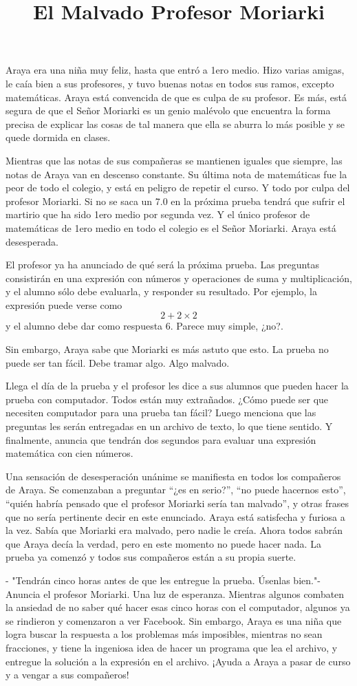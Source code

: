 \documentclass{oci}
\title{El Malvado Profesor Moriarki}
\begin{document}
\begin{problemDescription}
Araya era una niña muy feliz, hasta que entró a 1ero medio. Hizo varias amigas, le caía bien a sus profesores, y tuvo buenas notas en todos sus ramos, excepto matemáticas. Araya está convencida de que es culpa de su profesor. Es más, está segura de que el Señor Moriarki es un genio malévolo que encuentra la forma precisa de explicar las cosas de tal manera que ella se aburra lo más posible y se quede dormida en clases.

Mientras que las notas de sus compañeras se mantienen iguales que siempre, las notas de Araya van en descenso constante. Su última nota de matemáticas fue la peor de todo el colegio, y está en peligro de repetir el curso. Y todo por culpa del profesor Moriarki. Si no se saca un 7.0 en la próxima prueba tendrá que sufrir el martirio que ha sido 1ero medio por segunda vez. Y el único profesor de matemáticas de 1ero medio en todo el colegio es el Señor Moriarki. Araya está desesperada.

El profesor ya ha anunciado de qué será la próxima prueba. Las preguntas consistirán en una expresión con números y operaciones de suma y multiplicación, y el alumno sólo debe evaluarla, y responder su resultado. Por ejemplo, la expresión puede verse como
$$
2 + 2 \times 2
$$
y el alumno debe dar como respuesta $6$. Parece muy simple, ¿no?.

Sin embargo, Araya sabe que Moriarki es más astuto que esto. La prueba no puede ser tan fácil. Debe tramar algo. Algo malvado.

Llega el día de la prueba y el profesor les dice a sus alumnos que pueden hacer la prueba con computador. Todos están muy extrañados. ¿Cómo puede ser que necesiten computador para una prueba tan fácil? Luego menciona que las preguntas les serán entregadas en un archivo de texto, lo que tiene sentido. Y finalmente, anuncia que tendrán dos segundos para evaluar una expresión matemática con cien números.

Una sensación de desesperación unánime se manifiesta en todos los compañeros de Araya. Se comenzaban a preguntar ``¿es en serio?'', ``no puede hacernos esto'', ``quién habría pensado que el profesor Moriarki sería tan malvado'', y otras frases que no sería pertinente decir en este enunciado. Araya está satisfecha y furiosa a la vez. Sabía que Moriarki era malvado, pero nadie le creía. Ahora todos sabrán que Araya decía la verdad, pero en este momento no puede hacer nada. La prueba ya comenzó y todos sus compañeros están a su propia suerte.

- "Tendrán cinco horas antes de que les entregue la prueba. Úsenlas bien."- Anuncia el profesor Moriarki. Una luz de esperanza. Mientras algunos combaten la ansiedad de no saber qué hacer esas cinco horas con el computador, algunos ya se rindieron y comenzaron a ver Facebook. Sin embargo, Araya es una niña que logra buscar la respuesta a los problemas más imposibles, mientras no sean fracciones, y tiene la ingeniosa idea de hacer un programa que lea el archivo, y entregue la solución a la expresión en el archivo. ¡Ayuda a Araya a pasar de curso y a vengar a sus compañeros!

\end{problemDescription}
\end{document}
